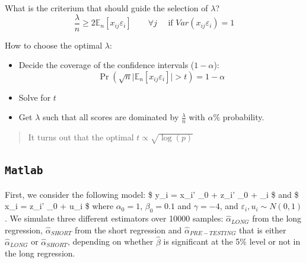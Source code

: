 \documentclass[12pt,]{book}
\providecommand{\tightlist}{%
  \setlength{\itemsep}{0pt}\setlength{\parskip}{0pt}}
\begin{document}
What is the criterium that should guide the selection of \(\lambda\)?
\[
  \frac{\lambda}{n} \geq 2 \mathbb E_n[x_{ij} \varepsilon_i] \qquad \forall j \quad \text{ if } Var(x_{ij} \varepsilon_i) = 1
\]

How to choose the optimal \(\lambda\):

\begin{itemize}
\tightlist
\item
  Decide the coverage of the confidence intervals (\(1-\alpha\)):
  \[
  \Pr \left( \sqrt{n} \Big| \mathbb E_n [x_{ij} \varepsilon_i] \Big| > t \right) = 1- \alpha
  \]
\item
  Solve for \(t\)
\item
  Get \(\lambda\) such that all scores are dominated by \(\frac{\lambda}{n}\) with \(\alpha\%\) probability.
\end{itemize}

\begin{quote}
It turns out that the optimal \(t \propto \sqrt{\log(p)}\)
\end{quote}

\hypertarget{matlab-8}{%
\subsection{\texorpdfstring{\texttt{Matlab}}{Matlab}}\label{matlab-8}}

First, we consider the following model: \$ y\_i = x\_i' \alpha\_0 + z\_i' \beta\_0 + \varepsilon\_i \$ and
\$ x\_i = z\_i' \gamma\_0 + u\_i \$ where \(\alpha_0 = 1\), \(\beta_0 = 0.1\) and \(\gamma = -4\), and \(\varepsilon_i, u_i \sim N(0,1)\). We simulate three different estimators over 10000 samples: \(\hat \alpha_{LONG}\) from the long regression, \(\hat \alpha_{SHORT}\) from the short regression and \(\hat \alpha_{PRE-TESTING}\) that is either \(\hat \alpha_{LONG}\) or \(\hat \alpha_{SHORT}\), depending on whether \(\hat \beta\) is significant at the 5\% level or not in the long regression.
\end{document}
